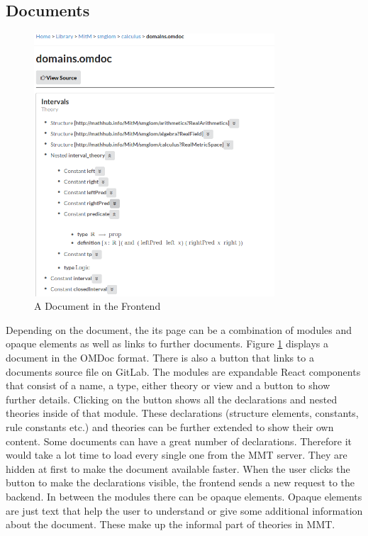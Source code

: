 \documentclass[11pt,a4paper]{article}
\begin{document}
\subsection{Documents}
\begin{figure}[H]
\centerline{\includegraphics[width=0.8\textwidth]{document.png}}
\caption{A Document in the Frontend}
\label{fig:doc}
\end{figure}
Depending on the document, the its page can be a combination of modules and opaque elements as well as links to further documents.
Figure \ref{fig:doc} displays a document in the OMDoc format.
There is also a button that links to a documents source file on GitLab.
\newline \newline
The modules are expandable React components that consist of a name, a type, either theory or view and a button to show further details.
Clicking on the button shows all the declarations and nested theories inside of that module.
These declarations (structure elements, constants, rule constants etc.) and theories can be further extended to show their own content.
Some documents can have a great number of declarations.
Therefore it would take a lot time to load every single one from the MMT server.
They are hidden at first to make the document available faster.
When the user clicks the button to make the declarations visible, the frontend sends a new request to the backend. 
\newline \newline
In between the modules there can be opaque elements.
Opaque elements are just text that help the user to understand or give some additional information about the document.
These make up the informal part of theories in MMT.
\end{document}
